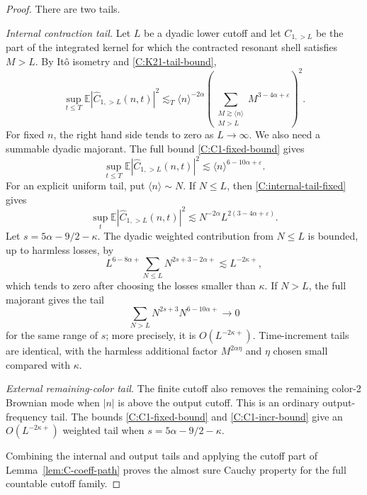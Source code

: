 \documentclass[10pt]{amsart}
\numberwithin{equation}{section}
\theoremstyle{plain}
\theoremstyle{definition}
\theoremstyle{remark}
\newcommand{\E}{\mathbb{E}}
\newcommand{\eps}{\varepsilon}
\newcommand{\la}{\langle}
\newcommand{\ra}{\rangle}
\newcommand{\wh}{\widehat}
\begin{document}
\begin{proof}
There are two tails.

\emph{Internal contraction tail.}  Let \(L\) be a dyadic lower cutoff and let \(C_{1,>L}\) be the part of the integrated kernel for which the contracted resonant shell satisfies \(M>L\).  By Itô isometry and \eqref{C:K21-tail-bound},
\begin{equation}\label{C:internal-tail-fixed}
        \sup_{t\le T}\E|\wh C_{1,>L}(n,t)|^2
        \lesssim_T
        \la n\ra^{-2\alpha}
        \left(
        \sum_{\substack{M\gtrsim\la n\ra\\ M>L}}
        M^{3-4\alpha+\eps}
        \right)^2.
\end{equation}
For fixed \(n\), the right hand side tends to zero as \(L\to\infty\).  We also need a summable dyadic majorant.  The full bound \eqref{C:C1-fixed-bound} gives
\begin{equation}\label{C:internal-majorant}
        \sup_{t\le T}\E|\wh C_{1,>L}(n,t)|^2
        \lesssim \la n\ra^{6-10\alpha+\eps}.
\end{equation}
For an explicit uniform tail, put \(\la n\ra\sim N\).  If \(N\le L\), then \eqref{C:internal-tail-fixed} gives
\[
        \sup_t\E|\wh C_{1,>L}(n,t)|^2
        \lesssim N^{-2\alpha}L^{2(3-4\alpha+\eps)}.
\]
Let \(s=5\alpha-9/2-\kappa\).  The dyadic weighted contribution from \(N\le L\) is bounded, up to harmless losses, by
\[
        L^{6-8\alpha+}
        \sum_{N\le L}N^{2s+3-2\alpha+}
        \lesssim L^{-2\kappa+},
\]
which tends to zero after choosing the losses smaller than \(\kappa\).  If \(N>L\), the full majorant gives the tail
\[
        \sum_{N>L}N^{2s+3}N^{6-10\alpha+}\to0
\]
for the same range of \(s\); more precisely, it is $O(L^{-2\kappa+})$.  Time-increment tails are identical, with the harmless additional factor \(M^{2\alpha\eta}\) and \(\eta\) chosen small compared with $\kappa$.

\emph{External remaining-color tail.}  The finite cutoff also removes the remaining color-2 Brownian mode when \(|n|\) is above the output cutoff.  This is an ordinary output-frequency tail.  The bounds \eqref{C:C1-fixed-bound} and \eqref{C:C1-incr-bound} give an $O(L^{-2\kappa+})$ weighted tail when $s=5\alpha-9/2-\kappa$.

Combining the internal and output tails and applying the cutoff part of Lemma~\ref{lem:C-coeff-path} proves the almost sure Cauchy property for the full countable cutoff family.
\end{proof}
\end{document}
